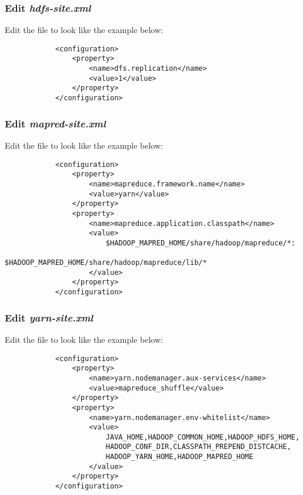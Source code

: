 \documentclass{article}
\begin{document}
        \subsubsection{Edit \emph{hdfs-site.xml}}
        Edit the file  to look like the example below:
        \begin{verbatim}
            <configuration>
                <property>
                    <name>dfs.replication</name>
                    <value>1</value>
                </property>
            </configuration>
        \end{verbatim}
        
        \subsubsection{Edit \emph{mapred-site.xml}}
        Edit the file  to look like the example below:
        \begin{verbatim}
            <configuration>
                <property>
                    <name>mapreduce.framework.name</name>
                    <value>yarn</value>
                </property>
                <property>
                    <name>mapreduce.application.classpath</name>
                    <value>
                        $HADOOP_MAPRED_HOME/share/hadoop/mapreduce/*:
                        $HADOOP_MAPRED_HOME/share/hadoop/mapreduce/lib/*
                    </value>
                </property>
            </configuration>
        \end{verbatim}
        
        \subsubsection{Edit \emph{yarn-site.xml}}
        Edit the file  to look like the example below:
        \begin{verbatim}
            <configuration>
                <property>
                    <name>yarn.nodemanager.aux-services</name>
                    <value>mapreduce_shuffle</value>
                </property>
                <property>
                    <name>yarn.nodemanager.env-whitelist</name>
                    <value>
                        JAVA_HOME,HADOOP_COMMON_HOME,HADOOP_HDFS_HOME,
                        HADOOP_CONF_DIR,CLASSPATH_PREPEND_DISTCACHE,
                        HADOOP_YARN_HOME,HADOOP_MAPRED_HOME
                    </value>
                </property>
            </configuration>
        \end{verbatim}
\end{document}

